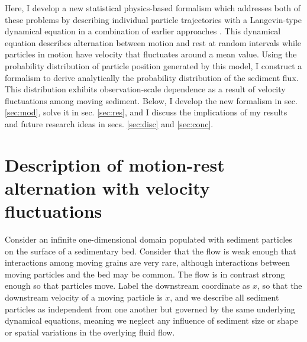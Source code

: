 Here, I develop a new statistical physics-based formalism which addresses both of these problems by describing individual particle trajectories with a Langevin-type dynamical equation in a combination of earlier approaches \citep{Fan2014,Ancey2014,Lisle1998,Lajeunesse2017}.
This dynamical equation describes alternation between motion and rest at random intervals while particles in motion have velocity that fluctuates around a mean value.
Using the probability distribution of particle position generated by this model, I construct a formalism to derive analytically the probability distribution of the sediment flux. This distribution exhibits observation-scale dependence as a result of velocity fluctuations among moving sediment.
Below, I develop the new formalism in sec. \ref{sec:mod}, solve it in sec. \ref{sec:res}, and I discuss the implications of my results and future research ideas in secs. \ref{sec:disc} and \ref{sec:conc}.

\section{Description of motion-rest alternation with velocity fluctuations \label{sec:mod}}
Consider an infinite one-dimensional domain populated with sediment particles on the surface of a sedimentary bed. Consider that the flow is weak enough that interactions among moving grains are very rare, although interactions between moving particles and the bed may be common. The flow is in contrast strong enough so that particles move.
Label the downstream coordinate as $x$, so that the downstream velocity of a moving particle is $\dot{x}$, and we describe all sediment particles as independent from one another but governed by the same underlying dynamical equations, meaning we neglect any influence of sediment size or shape or spatial variations in the overlying fluid flow.


